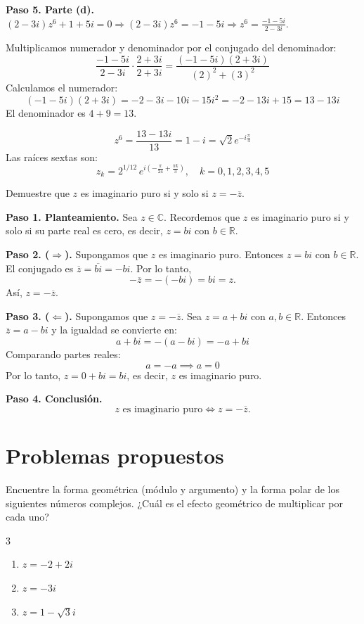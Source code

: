 \begin{prob}
\begin{myproof}
\textbf{Paso 5. Parte (d).} $(2-3i)z^6 + 1 + 5i = 0\Rightarrow (2-3i)z^6 = -1 - 5i\Rightarrow z^6 = \frac{-1 - 5i}{2 - 3i}.$


Multiplicamos numerador y denominador por el conjugado del denominador:
\[
\frac{-1 - 5i}{2 - 3i} \cdot \frac{2 + 3i}{2 + 3i} = \frac{(-1 - 5i)(2 + 3i)}{(2)^2 + (3)^2}
\]
Calculamos el numerador:
\[
(-1 - 5i)(2 + 3i) = -2 - 3i - 10i - 15i^2 = -2 - 13i + 15 = 13 - 13i
\]
El denominador es $4 + 9 = 13$.

\[
z^6 = \frac{13 - 13i}{13} = 1 - i = \sqrt{2} e^{-i\frac{\pi}{4}}
\]
Las raíces sextas son:
\[
\boxed{
z_k = 2^{1/12} \, e^{i\left( -\frac{\pi}{24} + \frac{\pi k}{3} \right ) }, \quad k=0,1,2,3,4,5
}
\]

\end{myproof}

\end{prob}

\begin{prob}
Demuestre que $z$ es imaginario puro si y solo si $z=-\overline{z}$.
\begin{myproof}
\textbf{Paso 1. Planteamiento.} Sea $z \in \mathbb{C}$. Recordemos que $z$ es imaginario puro si y solo si su parte real es cero, es decir, $z = bi$ con $b \in \mathbb{R}$.

\textbf{Paso 2. ($\Rightarrow$).} Supongamos que $z$ es imaginario puro.  
Entonces $z = bi$ con $b \in \mathbb{R}$.  
El conjugado es $\overline{z} = \overline{bi} = -bi$.  
Por lo tanto,
\[
-\overline{z} = -(-bi) = bi = z.
\]
Así, $z = -\overline{z}$.

\textbf{Paso 3. ($\Leftarrow$).} Supongamos que $z = -\overline{z}$.  
Sea $z = a + bi$ con $a, b \in \mathbb{R}$.  
Entonces $\overline{z} = a - bi$ y la igualdad se convierte en:
\[
a + bi = - (a - bi) = -a + bi
\]
Comparando partes reales:
\[
a = -a \implies a = 0
\]
Por lo tanto, $z = 0 + bi = bi$, es decir, $z$ es imaginario puro.

\textbf{Paso 4. Conclusión.}
\[
\boxed{z \text{ es imaginario puro} \iff z = -\overline{z}.}
\]
\end{myproof}

\end{prob}

\section{Problemas propuestos}

\begin{prob}
Encuentre la forma geométrica (módulo y argumento) y la forma polar de los siguientes números complejos. ¿Cuál es el efecto geométrico de multiplicar por cada uno?
\begin{multicols}{3}
\begin{enumerate}[$a)$]
\item $z=-2+2i$
\item $z=-3i$
\item $z=1-\sqrt{3}i$
\end{enumerate}
\end{multicols}
\end{prob}


